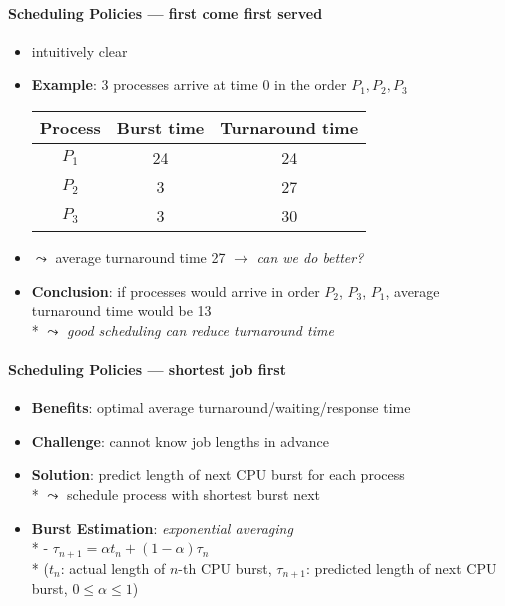 \paragraph{Scheduling Policies --- first come first served}
\begin{itemize}
  \item intuitively clear
  \item \textbf{Example}: 3 processes arrive at time 0 in the order \( P_1, P_2, P_3 \)
    \begin{center}
      \begin{tabular}{|c|c|c|}
        \textbf{Process} & \textbf{Burst time} & \textbf{Turnaround time} \\
        \hline
        \( P_1 \) & 24 & 24 \\
        \( P_2 \) & 3 & 27 \\
        \( P_3 \) & 3 & 30
      \end{tabular}
    \end{center}
  \item \( \leadsto \) average turnaround time 27 \( \to \) \emph{can we do better?}
  \item \textbf{Conclusion}: if processes would arrive in order \( P_2 \), \( P_3 \), \( P_1 \), average turnaround time would be 13 \\*
    \( \leadsto \) \emph{good scheduling can reduce turnaround time}
\end{itemize}

\paragraph{Scheduling Policies --- shortest job first}
\begin{itemize}
  \item \textbf{Benefits}: optimal average turnaround/waiting/response time
  \item \textbf{Challenge}: cannot know job lengths in advance
  \item \textbf{Solution}: predict length of next CPU burst for each process \\*
    \( \leadsto \) schedule process with shortest burst next
  \item \textbf{Burst Estimation}: \emph{exponential averaging} \\*
    - \( \tau_{n+1} = \alpha t_n + (1-\alpha)\tau_n \) \\* \phantom{-} (\( t_n \): actual length of \( n \)-th CPU burst, \( \tau_{n+1} \): predicted length of next CPU burst, \( 0 \leq \alpha \leq 1 \))
\end{itemize}

